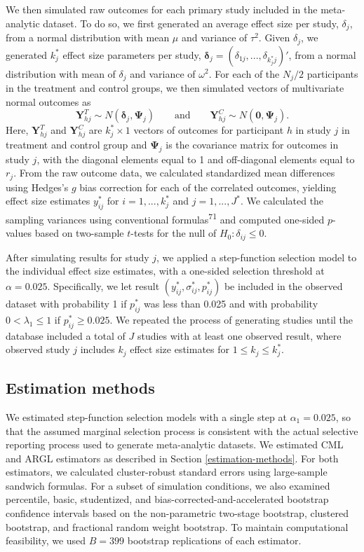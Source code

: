 \documentclass[
  american,
  man, donotrepeattitle,floatsintext]{apa7}
\begin{document}
We then simulated raw outcomes for each primary study included in the
meta-analytic dataset. To do so, we first generated an average effect
size per study, \(\delta_j\), from a normal distribution with mean \(\mu\) and variance
of \(\tau^2\). Given \(\delta_j\), we generated \(k_j^*\) effect size parameters per study, \(\boldsymbol\delta_j = \left(\delta_{1j},...,\delta_{k_j^* j}\right)'\), from a normal distribution with mean of \(\delta_j\) and
variance of \(\omega^2\).
For each of the \(N_j / 2\) participants in the treatment and control groups, we then simulated vectors of multivariate normal outcomes as
\[
\mathbf{Y}_{hj}^T \sim N(\boldsymbol\delta_j, \boldsymbol\Psi_j) \qquad \text{and} \qquad
\mathbf{Y}_{hj}^C \sim N(\mathbf{0}, \boldsymbol\Psi_j).
\]
Here, \(\mathbf{Y}_{hj}^T\) and \(\mathbf{Y}_{hj}^C\) are
\(k_j^* \times 1\) vectors of outcomes for participant \(h\) in study \(j\) in
treatment and control group and \(\boldsymbol\Psi_j\) is the covariance matrix for outcomes in study \(j\), with the diagonal elements equal to 1 and off-diagonal elements equal to \(r_j\).
From the raw outcome data, we calculated standardized mean
differences using Hedges's \(g\) bias correction for each of the correlated outcomes, yielding effect size estimates \(y^*_{ij}\) for \(i=1,...,k_j^*\) and \(j = 1,...,J^*\).
We calculated the sampling variances using conventional formulas\textsuperscript{71} and computed one-sided \(p\)-values based on two-sample \(t\)-tests for the null of \(H_0: \delta_{ij} \leq 0\).

After simulating results for study \(j\), we applied a step-function selection
model to the individual effect size estimates, with a one-sided selection
threshold at \(\alpha = 0.025\). Specifically, we let result \((y^*_{ij},
\sigma_{ij}^*, p_{ij}^*)\) be included in the observed dataset with probability
1 if \(p_{ij}^*\) was less than 0.025 and with probability \(0 < \lambda_1 \leq 1\) if \(p_{ij}^* \ge 0.025\).
We repeated the process of generating studies until the database included a total of \(J\) studies with at least one observed result, where observed study \(j\) includes \(k_j\) effect size estimates for \(1 \leq k_j \leq k_j^*\).

\subsection{Estimation methods}\label{estimation-methods-1}

We estimated step-function selection models with a single step at \(\alpha_1 = 0.025\), so that the assumed marginal selection process is consistent with the actual selective reporting process used to generate meta-analytic datasets.
We estimated CML and ARGL estimators as described in Section \ref{estimation-methods}.
For both estimators, we calculated cluster-robust standard errors using large-sample sandwich formulas.
For a subset of simulation conditions, we also examined percentile, basic, studentized, and bias-corrected-and-accelerated bootstrap confidence intervals based on the non-parametric two-stage bootstrap, clustered bootstrap, and fractional random weight bootstrap.
To maintain computational feasibility, we used \(B = 399\) bootstrap replications of each estimator.
\end{document}
